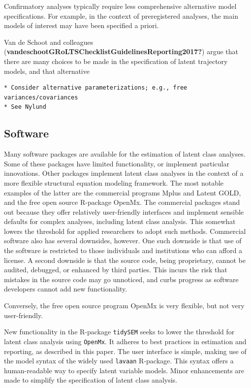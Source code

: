 \documentclass[
  ,man]{apa6}
\begin{document}
Confirmatory analyses typically require less comprehensive alternative model specifications.
For example, in the context of preregistered analyses, the main models of interest may have been specified a priori.

Van de Schoot and colleagues (\textbf{vandeschootGRoLTSChecklistGuidelinesReporting2017?}) argue that there are many choices to be made in the specification of latent trajectory models,
and that alternative

\begin{verbatim}
* Consider alternative parameterizations; e.g., free variances/covariances 
* See Nylund
\end{verbatim}

\hypertarget{software}{%
\subsection{Software}\label{software}}

Many software packages are available for the estimation of latent class analyses.
Some of these packages have limited functionality, or implement particular innovations.
Other packages implement latent class analyses in the context of a more flexible structural equation modeling framework.
The most notable examples of the latter are the commercial programs Mplus and Latent GOLD,
and the free open source R-package OpenMx.
The commercial packages stand out because they offer relatively user-friendly interfaces
and implement sensible defaults for complex analyses, including latent class analysis.
This somewhat lowers the threshold for applied researchers to adopt such methods.
Commercial software also has several downsides, however.
One such downside is that use of the software is restricted to those individuals and institutions who can afford a license.
A second downside is that the source code, being proprietary, cannot be audited, debugged, or enhanced by third parties.
This incurs the risk that mistakes in the source code may go unnoticed, and curbs progress as software developers cannot add new functionality.

Conversely, the free open source program OpenMx is very flexible,
but not very user-friendly.

New functionality in the R-package \texttt{tidySEM} seeks to lower the threshold for latent class analysis using \texttt{OpenMx}.
It adheres to best practices in estimation and reporting, as described in this paper.
The user interface is simple, making use of the model syntax of the widely used \texttt{lavaan} R-package.
This syntax offers a human-readable way to specify latent variable models.
Minor enhancements are made to simplify the specification of latent class analysis.
\end{document}
